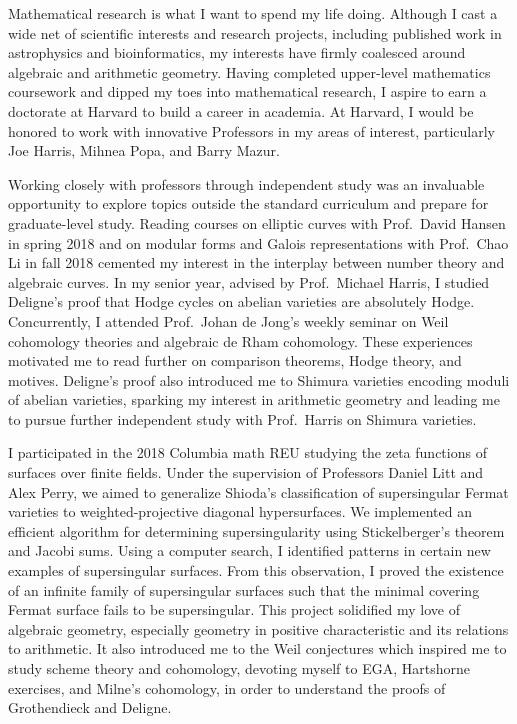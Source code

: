 \documentclass[11pt]{article}
\begin{document}
Mathematical research is what I want to spend my life doing. Although I cast a wide net of scientific interests and research projects, including published work in astrophysics and bioinformatics, my interests have firmly coalesced around algebraic and arithmetic geometry. Having completed upper-level mathematics coursework and dipped my toes into mathematical research, I aspire to earn a doctorate at Harvard to build a career in academia. At Harvard, I would be honored to work with innovative Professors in my areas of interest, particularly Joe Harris, Mihnea Popa, and Barry Mazur.
\par
Working closely with professors through independent study was an invaluable opportunity to explore topics outside the standard curriculum and prepare for graduate-level study. Reading courses on elliptic curves with Prof.\ David Hansen in spring 2018 and on modular forms and Galois representations with Prof.\ Chao Li in fall 2018 cemented my interest in the interplay between number theory and algebraic curves. In my senior year, advised by Prof.\ Michael Harris, I studied Deligne's proof that Hodge cycles on abelian varieties are absolutely Hodge. Concurrently, I attended Prof.\ Johan de Jong's weekly seminar on Weil cohomology theories and algebraic de Rham cohomology. These experiences motivated me to read further on comparison theorems, Hodge theory, and motives. Deligne's proof also introduced me to Shimura varieties encoding moduli of abelian varieties, sparking my interest in arithmetic geometry and leading me to pursue further independent study with Prof.\ Harris on Shimura varieties.
\par
I participated in the 2018 Columbia math REU studying the zeta functions of surfaces over finite fields. Under the supervision of Professors Daniel Litt and Alex Perry, we aimed to generalize Shioda’s classification of supersingular Fermat varieties  to weighted-projective diagonal hypersurfaces. We implemented an efficient algorithm for determining supersingularity using Stickelberger's theorem and Jacobi sums. Using a computer search, I identified patterns in certain new examples of supersingular surfaces. From this observation, I proved the existence of an infinite family of supersingular surfaces such that the minimal covering Fermat surface fails to be supersingular. This project solidified my love of algebraic geometry, especially geometry in positive characteristic and its relations to arithmetic. It also introduced me to the Weil conjectures which inspired me to study scheme theory and \etale cohomology, devoting myself to EGA, Hartshorne exercises, and Milne's \etale cohomology, in order to understand the proofs of Grothendieck and Deligne. 
\end{document}
